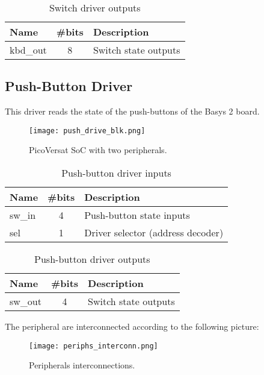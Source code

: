 \begin{table}[!htbp]
    \centering
    \caption{Switch driver outputs}
    \label{tab:swOut}
    \begin{tabular}{@{}lll@{}}
    \toprule
    Name     & \#bits                & Description          \\ \midrule
    kbd\_out & \multicolumn{1}{c}{8} & Switch state outputs \\ \bottomrule
    \end{tabular}
    \end{table}

\subsection{Push-Button Driver}

This driver reads the state of the push-buttons of the Basys 2 board.



\begin{figure}[!htbp]
    \centerline{\texttt{[image: push\_drive\_blk.png]}}
    \vspace{0cm}\caption{PicoVersat SoC with two peripherals.}
    \label{fig:periphs}
\end{figure}

\begin{table}[!htbp]
    \centering
    \caption{Push-button driver inputs}
    \label{tab:pshIn}
    \begin{tabular}{@{}lcl@{}}
    \toprule
    Name   & \multicolumn{1}{l}{\#bits} & Description                       \\ \midrule
    sw\_in & 4                          & Push-button state inputs              \\
    sel    & 1                          & Driver selector (address decoder) \\ \bottomrule
    \end{tabular}
    \end{table}

\begin{table}[!htbp]
    \centering
    \caption{Push-button driver outputs}
    \label{tab:pshOut}
    \begin{tabular}{@{}lll@{}}
    \toprule
    Name    & \#bits                & Description          \\ \midrule
    sw\_out & \multicolumn{1}{c}{4} & Switch state outputs
    \end{tabular}
    \end{table}

The peripheral are interconnected according to the following picture:

\begin{figure}[!htbp]
    \centerline{\texttt{[image: periphs\_interconn.png]}}
    \vspace{0cm}\caption{Peripherals interconnections.}
    \label{fig:periphs}
\end{figure}
